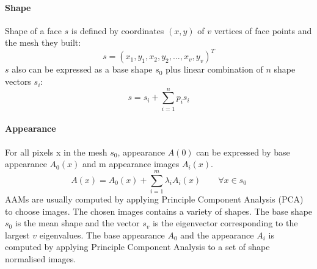 \paragraph{Shape}
Shape of a face $s$ is defined by coordinates $(x,y)$ of $v$ vertices of face points and the mesh they built:
\begin{equation}
s = (x_{1},y_{1},x_{2},y_{2},...,x_{v},y_{v})^{T}
\end{equation}
\newline
$s$ also can be expressed as a base shape $s_{0}$ plus linear combination of $n$ shape vectors $s_{i}$:
\begin{equation}
s = s_{i} + \sum_{i =1}^{n}p_{i}s_{i}
\end{equation}
\paragraph{Appearance}
For all pixels x in the mesh $s_{0}$, appearance $A(0)$ can be expressed by base appearance $A_{0}(x)$ and m appearance images $A_{i}(x)$.
\begin{equation}
A(x) = A_{0}(x) + \sum_{i=1}^{m}\lambda_{i}A_{i}(x) \qquad \forall x \in s_{0}
\end{equation}
\newline
AAMs are usually computed by applying Principle Component Analysis (PCA) to choose images. The chosen images contains a variety of shapes. The base shape $s_{0}$ is the mean shape and the vector $s_{v}$ is the eigenvector corresponding to the largest $v$ eigenvalues. The base appearance $A_{0}$ and the appearance $A_{i}$ is computed by applying Principle Component Analysis to a set of shape normalised images.
